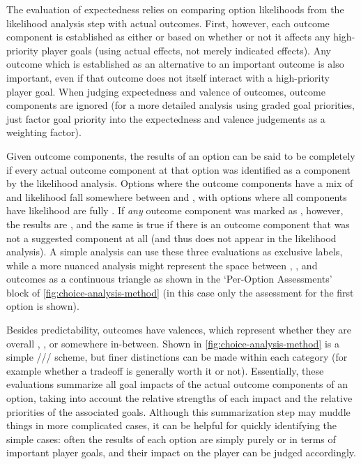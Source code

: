 The evaluation of expectedness relies on comparing option likelihoods from the likelihood analysis step with actual outcomes.
%
First, however, each outcome component is established as either  or  based on whether or not it affects any high-priority player goals (using actual effects, not merely indicated effects).
%
Any outcome which is established as an alternative to an important outcome is also important, even if that outcome does not itself interact with a high-priority player goal.
%
When judging expectedness and valence of outcomes,  outcome components are ignored (for a more detailed analysis using graded goal priorities, just factor goal priority into the expectedness and valence judgements as a weighting factor).


Given  outcome components, the results of an option can be said to be completely  if every  actual outcome component at that option was identified as a  component by the likelihood analysis.
%
Options where the  outcome components have a mix of  and  likelihood fall somewhere between  and , with options where all  components have  likelihood are fully .
%
If \emph{any}  outcome component was marked as , however, the results are , and the same is true if there is an  outcome component that was not a suggested component at all (and thus does not appear in the likelihood analysis).
%
A simple analysis can use these three evaluations as exclusive labels, while a more nuanced analysis might represent the space between , , and  outcomes as a continuous triangle as shown in the `Per-Option Assessments' block of \cref{fig:choice-analysis-method} (in this case only the assessment for the first option is shown).


Besides predictability, outcomes have valences, which represent whether they are overall , , or somewhere in-between.
%
Shown in \cref{fig:choice-analysis-method} is a simple /// scheme, but finer distinctions can be made within each category (for example whether a tradeoff is generally worth it or not).
%
Essentially, these evaluations summarize all goal impacts of the actual outcome components of an option, taking into account the relative strengths of each impact and the relative priorities of the associated goals.
%
Although this summarization step may muddle things in more complicated cases, it can be helpful for quickly identifying the simple cases: often the results of each option are simply purely  or  in terms of important player goals, and their impact on the player can be judged accordingly.


